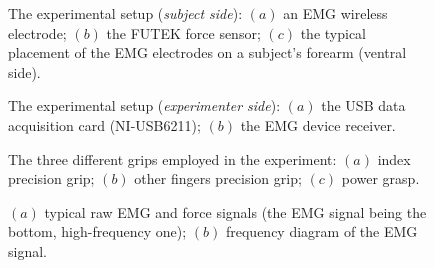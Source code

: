 \documentclass[10pt]{bmc_article}
\newenvironment{bmcformat}{\begin{raggedright}\baselineskip20pt\sloppy\setboolean{publ}{false}}{\end{raggedright}\baselineskip20pt\sloppy}
\begin{document}
\begin{bmcformat}
\begin{figure}[!ht] \centering
  \caption{The experimental setup (\textit{subject side}): $(a)$ an EMG
    wireless electrode; $(b)$ the FUTEK force sensor; $(c)$ the typical
    placement of the EMG electrodes on a subject's forearm (ventral side).}
  \label{fig:SubjSetup}
\end{figure}

\begin{figure}[!ht] \centering
  \caption{The experimental setup (\textit{experimenter side}): $(a)$
   the USB data acquisition card (NI-USB6211); $(b)$ the EMG device
   receiver.}
  \label{fig:ExpSetup}
\end{figure}

\begin{figure}[!t] \centering
  \caption{The three different grips employed in the experiment: $(a)$
   index precision grip; $(b)$ other fingers precision grip; $(c)$
   power grasp.}
  \label{fig:Grasps}
\end{figure}

\begin{figure}[!ht] \centering
  \caption{$(a)$ typical raw EMG and force signals (the EMG signal
    being the bottom, high-frequency one); $(b)$ frequency diagram of
    the EMG signal.}
  \label{fig:spectra}
\end{figure}


\end{bmcformat}
\end{document}
